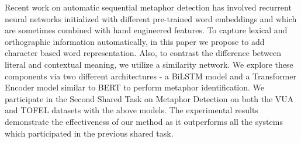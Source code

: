 Recent work on automatic sequential metaphor detection has involved recurrent neural networks initialized with different pre-trained word embeddings and which are sometimes combined with hand engineered features. To capture lexical and orthographic information automatically, in this paper we propose to add character based word representation. Also, to contrast the difference between literal and contextual meaning, we utilize a similarity network. We explore these components via two different architectures - a BiLSTM model and a Transformer Encoder model similar to BERT to perform metaphor identification. We participate in the Second Shared Task on Metaphor Detection on both the VUA and TOFEL datasets with the above models. The experimental results demonstrate the effectiveness of our method as it outperforms all the systems which participated in the previous shared task.
